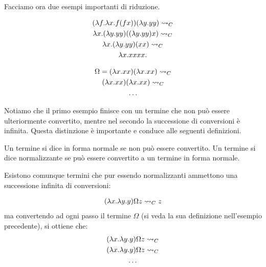 \documentclass[]{marticle}
\begin{document}
Facciamo ora due esempi importanti di riduzione.

\begin{block}[Esempio]
    \begin{gather*}
        (\lambda f . \lambda x . f(fx))(\lambda y. yy) \rightsquigarrow_C  \\
        \lambda x. (\lambda y. yy)((\lambda y.yy) x) \rightsquigarrow_C \\
        \lambda x .(\lambda y. yy)(xx) \rightsquigarrow_C \\
        \lambda x. xxxx.
    \end{gather*}
\end{block}

\begin{block}[Esempio]
    \begin{gather*}
        \Omega = (\lambda x.xx)(\lambda x.xx) \rightsquigarrow_C \\ 
        (\lambda x.xx)(\lambda x.xx) \rightsquigarrow_C \\
        \dots
    \end{gather*}
\end{block}

Notiamo che il primo esempio finisce con un termine che non pu\`o essere
ulteriormente convertito, mentre nel secondo la successione di conversioni \`e
infinita. Questa distinzione \`e importante e conduce alle seguenti definizioni.

\begin{block}[Definizione]
    Un termine si dice in forma normale se non pu\`o essere convertito. Un
    termine si dice normalizzante se pu\`o essere convertito a un termine in
    forma normale.
\end{block}

Esistono comunque termini che pur essendo normalizzanti ammettono una
successione infinita di conversioni:

\begin{block}[Esempio]
    \begin{gather*}
        (\lambda x . \lambda y. y)\Omega z \rightsquigarrow_C z
    \end{gather*}
    ma convertendo ad ogni passo il termine $\Omega$ (si veda la sua definizione
    nell'esempio precedente), si ottiene che:
    \begin{gather*}
        (\lambda x . \lambda y. y)\Omega z \rightsquigarrow_C \\ 
        (\lambda x . \lambda y. y)\Omega z \rightsquigarrow_C \\
        \dots
    \end{gather*}
\end{block}
\end{document}
